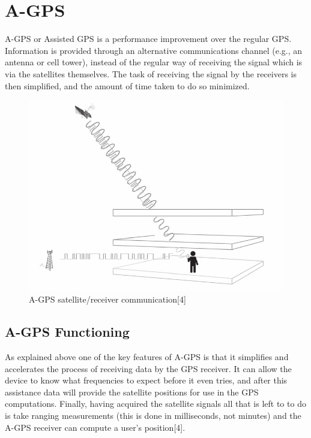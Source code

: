 \documentclass[conference]{IEEEtran}
\begin{document}
\section{A-GPS}

A-GPS or Assisted GPS is a performance improvement over the regular GPS. Information is provided through an alternative communications channel (e.g., an antenna or cell tower), instead of the regular way of receiving the signal which is via the satellites themselves.
The task of receiving the signal by the receivers is then simplified, and the amount of time taken to do so minimized.

\begin{figure}
    \centering
    \includegraphics[width=\columnwidth]{img2.png}
    \caption{A-GPS satellite/receiver communication[4]}
\end{figure}

\subsection{A-GPS Functioning}

As explained above one of the key features of A-GPS is that it simplifies and accelerates the process of receiving data by the GPS receiver. It can allow the device to know what frequencies to expect before it even tries, and after this assistance data will provide the satellite positions for use in the GPS computations. Finally, having acquired the satellite signals all that is left to to do is take ranging measurements (this is done in milliseconds, not minutes) and the A-GPS receiver can compute a user's position[4].
\end{document}
